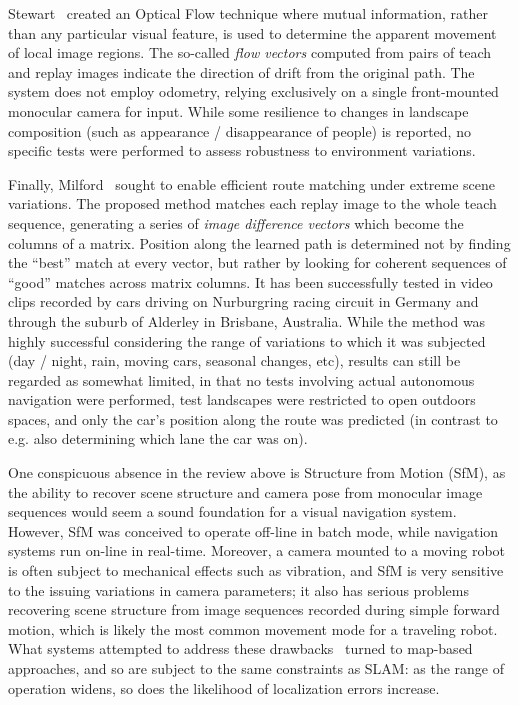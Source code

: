 \documentclass[twocolumn, 9pt,fleqn]{jsproceedings}
\begin{document}
Stewart~\cite{STE12} created an Optical Flow technique where mutual information, rather than any particular visual feature, is used to determine the apparent movement of local image regions. The so-called \textit{flow vectors} computed from pairs of teach and replay images indicate the direction of drift from the original path. The system does not employ odometry, relying exclusively on a single front-mounted monocular camera for input. While some resilience to changes in landscape composition (such as appearance / disappearance of people) is reported, no specific tests were performed to assess robustness to environment variations.

Finally, Milford~\cite{MIL12} sought to enable efficient route matching under extreme scene variations. The proposed method matches each replay image to the whole teach sequence, generating a series of \textit{image difference vectors} which become the columns of a matrix. Position along the learned path is determined not by finding the ``best'' match at every vector, but rather by looking for coherent sequences of ``good'' matches across matrix columns. It has been successfully tested in video clips recorded by cars driving on Nurburgring racing circuit in Germany and through the suburb of Alderley in Brisbane, Australia. While the method was highly successful considering the range of variations to which it was subjected (day / night, rain, moving cars, seasonal changes, etc), results can still be regarded as somewhat limited, in that no tests involving actual autonomous navigation were performed, test landscapes were restricted to open outdoors spaces, and only the car's position along the route was predicted (in contrast to e.g. also determining which lane the car was on).

One conspicuous absence in the review above is Structure from Motion (SfM), as the ability to recover scene structure and camera pose from monocular image sequences would seem a sound foundation for a visual navigation system. However, SfM was conceived to operate off-line in batch mode, while navigation systems run on-line in real-time. Moreover, a camera mounted to a moving robot is often subject to mechanical effects such as vibration, and SfM is very sensitive to the issuing variations in camera parameters; it also has serious problems recovering scene structure from image sequences recorded during simple forward motion, which is likely the most common movement mode for a traveling robot. What systems attempted to address these drawbacks~\cite{BEA97,ROY07} turned to map-based approaches, and so are subject to the same constraints as SLAM: as the range of operation widens, so does the likelihood of localization errors increase.
\end{document}
